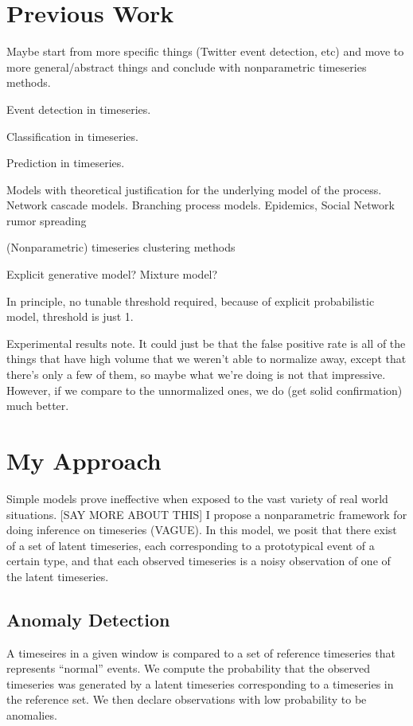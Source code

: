 \section{Previous Work}
Maybe start from more specific things (Twitter event detection, etc) and move to more general/abstract things and conclude with nonparametric timeseries methods.

Event detection in timeseries.

Classification in timeseries.

Prediction in timeseries.

Models with theoretical justification for the underlying model of the process. Network cascade models. Branching process models.
Epidemics, Social Network rumor spreading

(Nonparametric) timeseries clustering methods

Explicit generative model? Mixture model?

In principle, no tunable threshold required, because of explicit probabilistic model, threshold is just 1.

Experimental results note. It could just be that the false positive rate is all of the things that have high volume that we weren't able to normalize away, except that there's only a few of them, so maybe what we're doing is not that impressive. However, if we compare to the unnormalized ones, we do (get solid confirmation) much better. 

\section{My Approach}
Simple models prove ineffective when exposed to the vast variety of real world situations. [SAY MORE ABOUT THIS] I propose a nonparametric framework for doing inference on timeseries (VAGUE). In this model, we posit that there exist of a set of latent timeseries, each corresponding to a prototypical event of a certain type, and that each observed timeseries is a noisy observation of one of the latent timeseries.

\subsection{Anomaly Detection}
A timeseires in a given window is compared to a set of reference timeseries that represents ``normal'' events. We compute the probability that the observed timeseries was generated by a latent timeseries corresponding to a timeseries in the reference set. We then declare observations with low probability to be anomalies.


